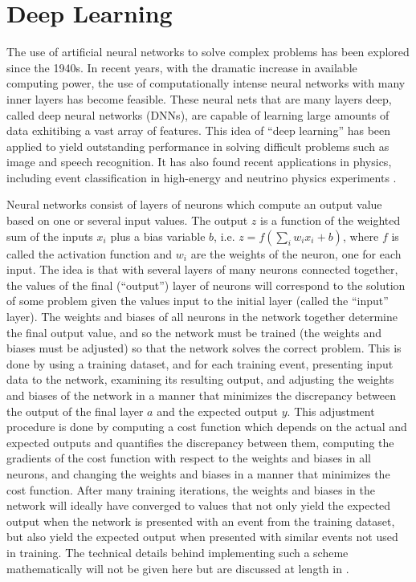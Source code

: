\documentclass[a4paper,11pt]{article}
\begin{document}
\section{Deep Learning}
The use of artificial neural networks to solve complex problems has been explored since the 1940s.  In recent years, with the dramatic increase in available computing power, the use of computationally
intense neural networks with many inner layers has become feasible.  These neural nets that are many layers deep, called deep neural networks (DNNs), are capable of learning large
amounts of data exhitibing a vast array of features.  This idea of ``deep learning'' has been applied to yield outstanding performance in solving difficult problems such as image \cite{Googlenet} 
and speech \cite{Hinton_2012} recognition.  It has also found recent applications in physics, including event classification in high-energy and neutrino physics experiments \cite{Aurisano_2016, Baldi_2014, deOliveira_2016, Racah_2016}.

Neural networks consist of layers of neurons which compute an output value based on one or several input values.  The output $z$ is a function of the weighted sum of the inputs $x_{i}$ plus a bias variable $b$, i.e. $z = f(\sum_{i}w_{i}x_{i} + b)$, where $f$ is called the activation function and $w_{i}$ are the weights of the neuron, one for each input.  The idea is that
with several layers of many neurons connected together, the values of the final (``output'') layer of neurons will correspond to the solution of some problem given the values input to the
initial layer (called the ``input'' layer).  The weights and biases of all neurons in the network together determine the final output value, and so the network must be trained (the weights and
biases must be adjusted) so that the network solves the correct problem.  This is done by using a training dataset, and for each training event, presenting input data to the network, 
examining its resulting output, and adjusting the weights and biases of the network in a manner that minimizes the discrepancy between the output of the final layer $a$ and the expected 
output $y$.  This adjustment procedure is done by computing a cost function which depends on the actual and expected outputs and quantifies the discrepancy between them, computing 
the gradients of the cost function with respect to the weights and biases in all neurons, and changing the weights and biases in a manner that minimizes the cost function.  After many training
iterations, the weights and biases in the network will ideally have converged to values that not only yield the expected output when the network is presented with an event from the training
dataset, but also yield the expected output when presented with similar events not used in training.  The technical
details behind implementing such a scheme mathematically will not be given here but are discussed at length in \cite{Nielsen_2016}.
\end{document}
